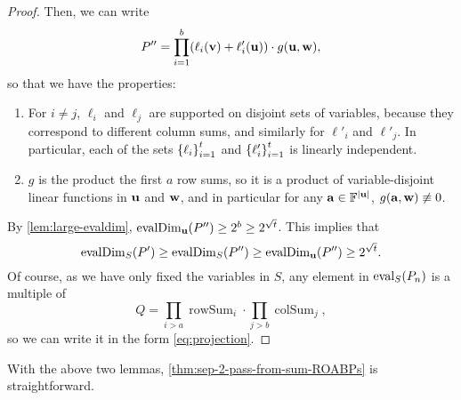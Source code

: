 \documentclass[11pt]{article}
\def\rowsum{\operatorname{rowSum}}
\def\colsum{\operatorname{colSum}}
\begin{document}
\begin{proof}
Then, we can write
\[
P'' = \prod_{i=1}^b (\ell_i(\mathbf{v}) + \ell'_i(\mathbf{u})) \cdot g(\mathbf{u}, \mathbf{w}),
\]
so that we have the properties:
\begin{enumerate}
\item For $i \neq j$, $\ell_i$ and $\ell_j$ are supported on disjoint sets of variables, because they correspond to different column sums, and similarly for $\ell'_i$ and $\ell'_j$. In particular, each of the sets $\left\{ \ell_i \right\}_{i=1}^t$ and $\left\{ \ell'_i \right\}_{i=1}^t$ is linearly independent.
\item $g$ is the product the first $a$ row sums, so it is a product of variable-disjoint linear functions in $\mathbf{u}$ and $\mathbf{w}$, and in particular for any $\veca \in \F^{|\vecu|}$, $g(\mathbf{a},\mathbf{w}) \not\equiv0$. 
\end{enumerate}
By \autoref{lem:large-evaldim}, $\operatorname{evalDim}_{\mathbf{u}}(P'') \ge 2^b \ge 2^{\sqrt{t}}$. This implies that
\[
\operatorname{evalDim}_{S}(P') \ge \operatorname{evalDim}_{S}(P'') \ge \operatorname{evalDim}_{\mathbf{u}}(P'') \ge 2^{\sqrt{t}}.
\]
Of course, as we have only fixed the variables in $S$, any element in $\operatorname{eval}_S(P_n)$ is a multiple of $$Q = \prod_{i > a} \rowsum_i \cdot \prod_{j>b} \colsum_j,$$ so we can write it in the form \eqref{eq:projection}.
\end{proof}

With the above two lemmas, \autoref{thm:sep-2-pass-from-sum-ROABPs} is straightforward. 
\end{document}
